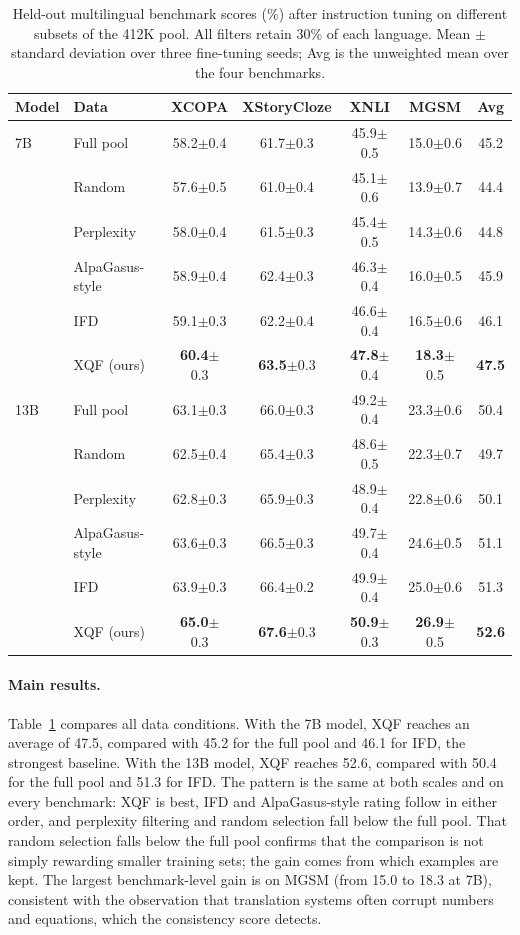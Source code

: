 \documentclass{article}
\begin{document}
\begin{table}[t]
\centering
\caption{Held-out multilingual benchmark scores (\%) after instruction tuning on different subsets of the 412K pool. All filters retain 30\% of each language. Mean $\pm$ standard deviation over three fine-tuning seeds; Avg is the unweighted mean over the four benchmarks.}
\label{tab:main}
\small
\begin{tabular}{llccccc}
\toprule
Model & Data & XCOPA & XStoryCloze & XNLI & MGSM & Avg \\
\midrule
7B & Full pool & 58.2$\pm$0.4 & 61.7$\pm$0.3 & 45.9$\pm$0.5 & 15.0$\pm$0.6 & 45.2 \\
 & Random & 57.6$\pm$0.5 & 61.0$\pm$0.4 & 45.1$\pm$0.6 & 13.9$\pm$0.7 & 44.4 \\
 & Perplexity & 58.0$\pm$0.4 & 61.5$\pm$0.3 & 45.4$\pm$0.5 & 14.3$\pm$0.6 & 44.8 \\
 & AlpaGasus-style & 58.9$\pm$0.4 & 62.4$\pm$0.3 & 46.3$\pm$0.4 & 16.0$\pm$0.5 & 45.9 \\
 & IFD & 59.1$\pm$0.3 & 62.2$\pm$0.4 & 46.6$\pm$0.4 & 16.5$\pm$0.6 & 46.1 \\
 & XQF (ours) & \textbf{60.4}$\pm$0.3 & \textbf{63.5}$\pm$0.3 & \textbf{47.8}$\pm$0.4 & \textbf{18.3}$\pm$0.5 & \textbf{47.5} \\
\midrule
13B & Full pool & 63.1$\pm$0.3 & 66.0$\pm$0.3 & 49.2$\pm$0.4 & 23.3$\pm$0.6 & 50.4 \\
 & Random & 62.5$\pm$0.4 & 65.4$\pm$0.3 & 48.6$\pm$0.5 & 22.3$\pm$0.7 & 49.7 \\
 & Perplexity & 62.8$\pm$0.3 & 65.9$\pm$0.3 & 48.9$\pm$0.4 & 22.8$\pm$0.6 & 50.1 \\
 & AlpaGasus-style & 63.6$\pm$0.3 & 66.5$\pm$0.3 & 49.7$\pm$0.4 & 24.6$\pm$0.5 & 51.1 \\
 & IFD & 63.9$\pm$0.3 & 66.4$\pm$0.2 & 49.9$\pm$0.4 & 25.0$\pm$0.6 & 51.3 \\
 & XQF (ours) & \textbf{65.0}$\pm$0.3 & \textbf{67.6}$\pm$0.3 & \textbf{50.9}$\pm$0.3 & \textbf{26.9}$\pm$0.5 & \textbf{52.6} \\
\bottomrule
\end{tabular}
\end{table}

\paragraph{Main results.}
Table~\ref{tab:main} compares all data conditions. With the 7B model, XQF reaches an average of 47.5, compared with 45.2 for the full pool and 46.1 for IFD, the strongest baseline. With the 13B model, XQF reaches 52.6, compared with 50.4 for the full pool and 51.3 for IFD. The pattern is the same at both scales and on every benchmark: XQF is best, IFD and AlpaGasus-style rating follow in either order, and perplexity filtering and random selection fall below the full pool. That random selection falls below the full pool confirms that the comparison is not simply rewarding smaller training sets; the gain comes from which examples are kept. The largest benchmark-level gain is on MGSM (from 15.0 to 18.3 at 7B), consistent with the observation that translation systems often corrupt numbers and equations, which the consistency score detects.
\end{document}
